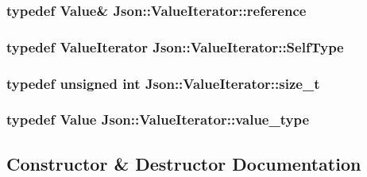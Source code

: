\subsubsection[{\texorpdfstring{reference}{reference}}]{\setlength{\rightskip}{0pt plus 5cm}typedef {\bf Value}\& {\bf Json\+::\+Value\+Iterator\+::reference}}\hypertarget{classJson_1_1ValueIterator_ae87929b4567aa00372cf602c43b57160}{}\label{classJson_1_1ValueIterator_ae87929b4567aa00372cf602c43b57160}
\subsubsection[{\texorpdfstring{Self\+Type}{SelfType}}]{\setlength{\rightskip}{0pt plus 5cm}typedef {\bf Value\+Iterator} {\bf Json\+::\+Value\+Iterator\+::\+Self\+Type}}\hypertarget{classJson_1_1ValueIterator_a23357670fdad61792670d86f62db7e16}{}\label{classJson_1_1ValueIterator_a23357670fdad61792670d86f62db7e16}
\subsubsection[{\texorpdfstring{size\+\_\+t}{size_t}}]{\setlength{\rightskip}{0pt plus 5cm}typedef unsigned int {\bf Json\+::\+Value\+Iterator\+::size\+\_\+t}}\hypertarget{classJson_1_1ValueIterator_a308b8932ffc83eaa9d12dadd5c11a7dd}{}\label{classJson_1_1ValueIterator_a308b8932ffc83eaa9d12dadd5c11a7dd}
\subsubsection[{\texorpdfstring{value\+\_\+type}{value_type}}]{\setlength{\rightskip}{0pt plus 5cm}typedef {\bf Value} {\bf Json\+::\+Value\+Iterator\+::value\+\_\+type}}\hypertarget{classJson_1_1ValueIterator_a2c5ba7be611f05546530c8a88b2d2e37}{}\label{classJson_1_1ValueIterator_a2c5ba7be611f05546530c8a88b2d2e37}


\subsection{Constructor \& Destructor Documentation}
